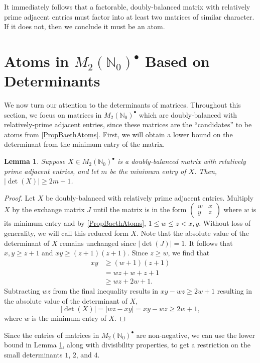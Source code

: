 \documentclass{amsart}
\newcommand{\pmx}[4]{\begin{pmatrix} #1 & #2 \\ #3 & #4 \end{pmatrix}}
\newcommand{\mtwo}{M_2(\mathbb{N}_0)^\bullet}
\newcommand{\absdet}[1]{\left|\det\left( #1 \right)\right|}
\newtheorem{lemma}[theorem]{Lemma}
\begin{document}
It immediately follows that a factorable, doubly-balanced matrix with relatively prime adjacent entries must factor into at least two matrices of similar character. If it does not, then we conclude it must be an atom.

\section{Atoms in $\mtwo$ Based on Determinants}\label{Sec. Determinant}



We now turn our attention to the determinants of matrices. 
Throughout this section, we focus on matrices in $\mtwo$ which are doubly-balanced with relatively-prime adjacent entries, since these matrices are the ``candidates'' to be atoms from \cref{PropBaethAtoms}. First, we will obtain a lower bound on the determinant from the minimum entry of the matrix.


\begin{lemma}\label{lem:DetMin}
    Suppose $X\in \mtwo$ is a doubly-balanced matrix with relatively prime adjacent entries, and let $m$ be the minimum entry of $X$. Then, $\absdet{X}\ge 2m+1$.
\end{lemma}

\begin{proof}
    Let $X$ be doubly-balanced with relatively prime adjacent entries. Multiply $X$ by the exchange matrix $J$ until the matrix is in the form $\pmx{w}{x}{y}{z}$ where $w$ is its minimum entry and by \cref{PropBaethAtoms}, $1\le w\le z<x,y$. Without loss of generality, we will call this reduced form $X$. Note that the absolute value of the determinant of $X$ remains unchanged since $\absdet{J}=1$. It follows that $x,y\ge z+1$ and $xy \ge (z+1)(z+1).$ Since $z\ge w$, we find that
    \begin{align*}
        xy &\ge (w+1)(z+1) \\
        &= wz+w+z+1 \\
        &\ge wz+2w+1.
    \end{align*}
Subtracting $wz$ from the final inequality results in $xy - wz \ge 2w+1$ resulting in the absolute value of the determinant of $X$, $$\absdet{X}=|wz-xy| = xy-wz\ge 2w+1,$$ where $w$ is the minimum entry of $X$.
\end{proof}

Since the entries of matrices in $\mtwo$ are non-negative, we can use the lower bound in Lemma \ref{lem:DetMin}, along with divisibility properties, to get a restriction on the small determinants $1$, $2$, and $4$.
\end{document}
